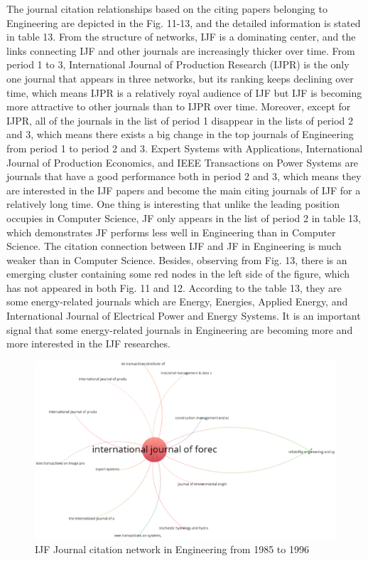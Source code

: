 \documentclass[11pt,a4paper]{elsarticle} %
\begin{document}
The journal citation relationships based on the citing papers belonging
to Engineering are depicted in the Fig. 11-13, and the detailed
information is stated in table 13. From the structure of networks, IJF
is a dominating center, and the links connecting IJF and other journals
are increasingly thicker over time. From period 1 to 3, International
Journal of Production Research (IJPR) is the only one journal that
appears in three networks, but its ranking keeps declining over time,
which means IJPR is a relatively royal audience of IJF but IJF is
becoming more attractive to other journals than to IJPR over time.
Moreover, except for IJPR, all of the journals in the list of period 1
disappear in the lists of period 2 and 3, which means there exists a big
change in the top journals of Engineering from period 1 to period 2 and
3. Expert Systems with Applications, International Journal of Production
Economics, and IEEE Transactions on Power Systems are journals that have
a good performance both in period 2 and 3, which means they are
interested in the IJF papers and become the main citing journals of IJF
for a relatively long time. One thing is interesting that unlike the
leading position occupies in Computer Science, JF only appears in the
list of period 2 in table 13, which demonstrates JF performs less well
in Engineering than in Computer Science. The citation connection between
IJF and JF in Engineering is much weaker than in Computer Science.
Besides, observing from Fig. 13, there is an emerging cluster containing
some red nodes in the left side of the figure, which has not appeared in
both Fig. 11 and 12. According to the table 13, they are some
energy-related journals which are Energy, Energies, Applied Energy, and
International Journal of Electrical Power and Energy Systems. It is an
important signal that some energy-related journals in Engineering are
becoming more and more interested in the IJF researches.

\begin{figure}[htbp]
\centering
\includegraphics[scale=0.3]{fig.11.eps}
\caption{IJF Journal citation network in Engineering from 1985 to 1996}
\end{figure}
\end{document}
